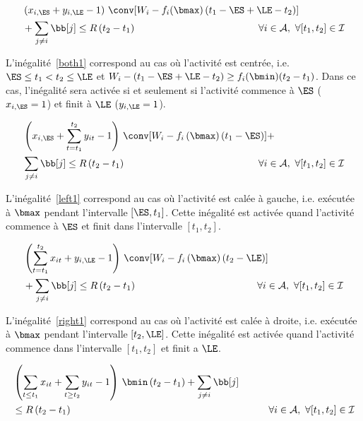 \begin{align}
&\left(x_{i,\ES} + y_{i,\LE} -1 \right) \, \conv[W_i-f_i(\bmax)\left(t_1-\ES + \LE
-t_2\right)] \nonumber \\
&+ \sum_{j\neq i} \bb[j] \le R\left(t_2-t_1\right) \hspace{4.35cm} \forall i \in
{\cal A},\ \forall [t_1,t_2] \in \I  \label{both1}
\end{align}

L'inégalité~\eqref{both1} correspond au cas où l'activité est centrée,
i.e. $\ES\le t_1<t_2 \le \LE$ et $W_i-\left(t_1-\ES + \LE -t_2\right)
\ge f_i(\bmin)(t_2-t_1)$. Dans ce cas, l'inégalité sera activée si et
seulement si l'activité commence à $\ES$ ($x_{i,\ES}=1$) et finit à
$\LE$ ($y_{i,\LE}=1$). 

\begin{align}
&\left(x_{i,\ES} + \sum_{t=t_1}^{t_2}y_{it} -1\right) \,
\conv[W_i-f_i\left(\bmax\right)\left(t_1-\ES\right)]+ \nonumber\\
&\sum_{j\neq i} \bb[j] \le R\left(t_2-t_1\right) \hspace{4.75cm} \forall i \in
  {\cal A},\ \forall [t_1,t_2] \in \I
\label{left1}
\end{align}

L'inégalité~\eqref{left1} correspond au cas où l'activité est calée à
gauche, i.e. exécutée à $\bmax$ pendant l'intervalle
$[\ES,t_1]$. Cette inégalité est activée quand l'activité commence à
$\ES$ et finit dans l'intervalle $[t_1,t_2]$. 

\begin{align}
&\left(\sum_{t=t_1}^{t_2}x_{it} + y_{i,\LE}-1\right) \,
\conv[W_i-f_i\left(\bmax\right)\left(t_2-\LE\right)]\nonumber\\
& + \sum_{j\neq i} \bb[j] \le R\left(t_2-t_1\right) \hspace{4.29cm} \forall i \in
{\cal A},\ \forall [t_1,t_2] \in \I
\label{right1}
\end{align} 

L'inégalité~\eqref{right1} correspond au cas où l'activité est calée à
droite, i.e. exécutée à $\bmax$ pendant l'intervalle
$[t_2,\LE]$. Cette inégalité est activée quand l'activité commence
dans l'intervalle $[t_1,t_2]$ et finit a $\LE$.

\begin{align}
&\left(\sum_{t\le t_1}x_{it} + \sum_{t\ge t_2}y_{it} -1 \right) \,
  \bmin\left(t_2-t_1\right) + \sum_{j\neq i} \bb[j] \nonumber\\
& \le R\left(t_2-t_1\right)\hspace{7cm} \forall i \in {\cal A},\ \forall [t_1,t_2]
\in \I
\label{min1}
\end{align}

